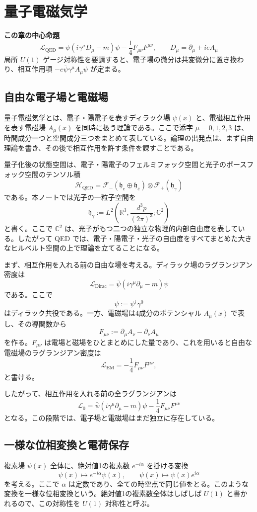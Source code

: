 \section{量子電磁気学}

\noindent\textbf{この章の中心命題}
\[
\boxed{
\mathcal{L}_{\mathrm{QED}}
=
\bar{\psi}(i\gamma^\mu D_\mu-m)\psi
-\frac{1}{4}F_{\mu\nu}F^{\mu\nu},
\qquad
D_\mu=\partial_\mu+ieA_\mu
}
\]
局所 $U(1)$ ゲージ対称性を要請すると、電子場の微分は共変微分に置き換わり、相互作用項 $-e\bar{\psi}\gamma^\mu A_\mu\psi$ が定まる。

\subsection{自由な電子場と電磁場}
量子電磁気学とは、電子・陽電子を表すディラック場 $\psi(x)$ と、電磁相互作用を表す電磁場 $A_\mu(x)$ を同時に扱う理論である。ここで添字 $\mu=0,1,2,3$ は、時間成分一つと空間成分三つをまとめて表している。論理の出発点は、まず自由理論を書き、その後で相互作用を許す条件を課すことである。

量子化後の状態空間は、電子・陽電子のフェルミフォック空間と光子のボースフォック空間のテンソル積
\[
\mathcal{H}_{\mathrm{QED}}
=
\mathcal{F}_-(\mathfrak{h}_e\oplus \mathfrak{h}_{\bar e})
\otimes
\mathcal{F}_+(\mathfrak{h}_\gamma)
\]
である。本ノートでは光子の一粒子空間を
\[
\mathfrak{h}_\gamma
:=
L^2\!\left(\mathbb{R}^3,\frac{d^3p}{(2\pi)^3};\mathbb{C}^2\right)
\]
と書く。ここで $\mathbb{C}^2$ は、光子がもつ二つの独立な物理的内部自由度を表している。したがって QED では、電子・陽電子・光子の自由度をすべてまとめた大きなヒルベルト空間の上で理論を立てることになる。

まず、相互作用を入れる前の自由な場を考える。ディラック場のラグランジアン密度は
\[
\mathcal{L}_{\mathrm{Dirac}}
=
\bar{\psi}(i\gamma^\mu \partial_\mu - m)\psi
\]
である。ここで
\[
\bar{\psi}:=\psi^\dagger \gamma^0
\]
はディラック共役である。一方、電磁場は4成分のポテンシャル $A_\mu(x)$ で表し、その導関数から
\[
F_{\mu\nu}:=\partial_\mu A_\nu-\partial_\nu A_\mu
\]
を作る。$F_{\mu\nu}$ は電場と磁場をひとまとめにした量であり、これを用いると自由な電磁場のラグランジアン密度は
\[
\mathcal{L}_{\mathrm{EM}}
=
-\frac{1}{4}F_{\mu\nu}F^{\mu\nu},
\]
と書ける。

したがって、相互作用を入れる前の全ラグランジアンは
\[
\mathcal{L}_0
=
\bar{\psi}(i\gamma^\mu \partial_\mu - m)\psi
- \frac{1}{4}F_{\mu\nu}F^{\mu\nu}
\]
となる。この段階では、電子場と電磁場はまだ独立に存在している。

\subsection{一様な位相変換と電荷保存}
複素場 $\psi(x)$ 全体に、絶対値1の複素数 $e^{-i\alpha}$ を掛ける変換
\[
\psi(x)\mapsto e^{-i\alpha}\psi(x),
\qquad
\bar{\psi}(x)\mapsto \bar{\psi}(x)e^{i\alpha}
\]
を考える。ここで $\alpha$ は定数であり、全ての時空点で同じ値をとる。このような変換を一様な位相変換という。絶対値1の複素数全体はしばしば $U(1)$ と書かれるので、この対称性を $U(1)$ 対称性と呼ぶ。

